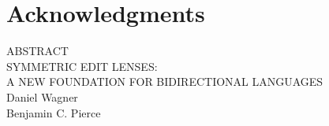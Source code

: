\documentclass[12pt]{report}
\numberwithin{equation}{section}
\def\thetitle{\uppercase{Symmetric Edit Lenses:\\A New Foundation For Bidirectional Languages}}
\def\theauthor{Daniel Wagner}
\def\theadvisor{Benjamin C. Pierce}
\begin{document}
\chapter*{Acknowledgments}

\newpage

\begin{center}
  ABSTRACT\\
  \thetitle\\
  \theauthor\\
  \theadvisor
\end{center}
\end{document}

